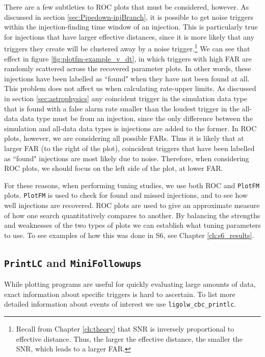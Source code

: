 There are a few subtleties to ROC plots that must be considered, however. As
discussed in section \ref{sec:Pipedown-injBranch}, it is possible to get noise
triggers within the injection-finding time window of an injection. This is
particularly true for injections that have larger effective distances, since
it is more likely that any triggers they create will be clustered away by a
noise trigger.\footnote{Recall from Chapter \ref{ch:theory} that \ac{SNR} is
inversely proportional to effective distance. Thus, the larger the effective
distance, the smaller the \ac{SNR}, which leads to a larger \ac{FAR}.} We can
see that effect in figure \ref{fig:plotfm-example_v_dt}, in which triggers with
high \ac{FAR} are randomly scattered across the recovered parameter plots. In
other words, these injections have been labelled as ``found" when they have not
been found at all. This problem does not affect us when calculating rate-upper
limits. As discussed in section \ref{sec:astrophysics} any coincident trigger
in the simulation data type that is found with a false alarm rate smaller than
the loudest trigger in the all-data data type must be from an injection, since
the only difference between the simulation and all-data data types is
injections are added to the former. In ROC plots, however, we are considering
all possible \acp{FAR}. Thus it is likely that at larger \ac{FAR} (to the right
of the plot), coincident triggers that have been labelled as ``found"
injections are most likely due to noise. Therefore, when considering ROC
plots, we should focus on the left side of the plot, at lower \ac{FAR}.

For these reasons, when performing tuning studies, we use both ROC and
\texttt{PlotFM} plots. \texttt{PlotFM} is used to check for found and missed
injections, and to see how well injections are recovered. ROC plots are used to
give an approximate measure of how one search quantitatively compares to
another. By balancing the strengths and weaknesses of the two types of plots we
can establish what tuning parameters to use. To see examples of how this was
done in \ac{S6}, see Chapter \ref{ch:s6_results}.

\subsection{\texttt{PrintLC} and \texttt{MiniFollowups}}
\label{sec:printlc-minifups}

While plotting programs are useful for quickly evaluating large amounts of
data, exact information about specific triggers is hard to ascertain. To list
more detailed information about events of interest we use
\verb|ligolw_cbc_printlc|.

